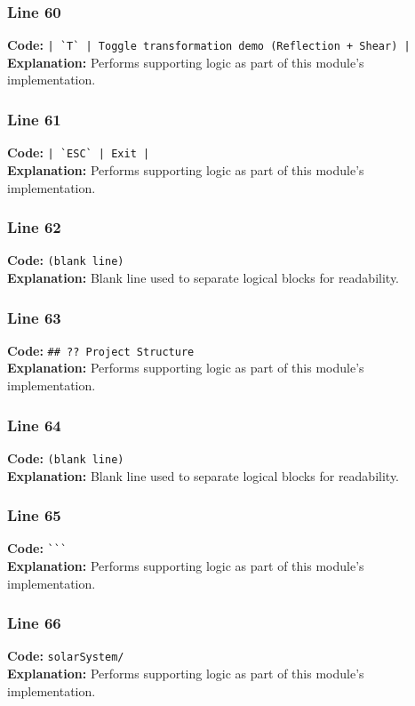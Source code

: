 \documentclass[11pt,a4paper]{article}
\begin{document}
\subsubsection*{Line 60}
\textbf{Code:} \verb!| `T` | Toggle transformation demo (Reflection + Shear) |!\\
\textbf{Explanation:} Performs supporting logic as part of this module's implementation.

\subsubsection*{Line 61}
\textbf{Code:} \verb!| `ESC` | Exit |!\\
\textbf{Explanation:} Performs supporting logic as part of this module's implementation.

\subsubsection*{Line 62}
\textbf{Code:} \texttt{(blank line)}\\
\textbf{Explanation:} Blank line used to separate logical blocks for readability.

\subsubsection*{Line 63}
\textbf{Code:} \verb|## ?? Project Structure|\\
\textbf{Explanation:} Performs supporting logic as part of this module's implementation.

\subsubsection*{Line 64}
\textbf{Code:} \texttt{(blank line)}\\
\textbf{Explanation:} Blank line used to separate logical blocks for readability.

\subsubsection*{Line 65}
\textbf{Code:} \verb|```|\\
\textbf{Explanation:} Performs supporting logic as part of this module's implementation.

\subsubsection*{Line 66}
\textbf{Code:} \verb|solarSystem/|\\
\textbf{Explanation:} Performs supporting logic as part of this module's implementation.
\end{document}
